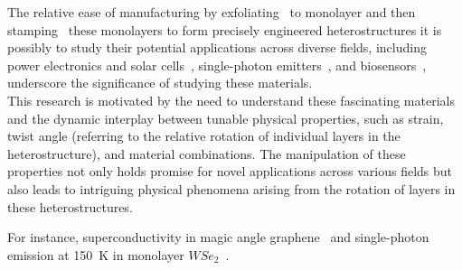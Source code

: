 The relative ease of manufacturing by exfoliating~\cite{bhushan2012encyclopedia,novoselovElectricFieldAtomically2004,kimLargescalePatternGrowth2009,deanBoronNitrideSubstrates2010a} to monolayer and then stamping~\cite{frisendaRecentProgressAssembly2018,castellanos-gomezDeterministicTransferTwodimensional2014} these monolayers to form precisely engineered heterostructures it is possibly to study their potential applications across diverse fields, including power electronics and solar cells~\cite{gongTwoStepGrowthTwoDimensional2015,liEpitaxialGrowthMonolayer2015,duanLateralEpitaxialGrowth2014,gongVerticalInplaneHeterostructures2014,hongUltrafastChargeTransfer2014}, single-photon emitters~\cite{koperskiSinglePhotonEmitters2015, rosenbergerQuantumCalligraphyWriting2019, pengCreationSinglePhotonEmitters2020}, and biosensors~\cite{loanGrapheneMoS2Heterostructures2014}, underscore the significance of studying these materials.\\

This research is motivated by the need to understand these fascinating materials and the dynamic interplay between tunable physical properties, such as strain, twist angle (referring to the relative rotation of individual layers in the heterostructure), and material combinations. The manipulation of these properties not only holds promise for novel applications across various fields but also leads to intriguing physical phenomena arising from the rotation of layers in these heterostructures.

For instance, superconductivity in magic angle graphene~\cite{caoUnconventionalSuperconductivityMagicangle2018} and single-photon emission at \SI{150}{\kelvin} in monolayer $WSe_2$~\cite{partoDefectStrainEngineering2021}.\\

